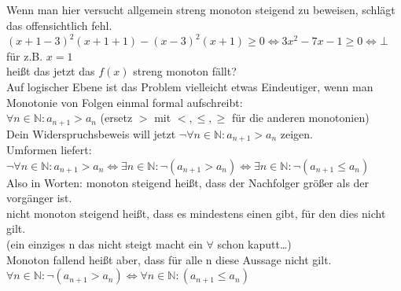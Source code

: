\documentclass{article}
\begin{document}
	Wenn man hier versucht allgemein streng monoton steigend zu beweisen, schlägt das offensichtlich fehl.\\
	$(x+1-3)^2(x+1+1) - (x-3)^2(x+1) \geq 0\iff 3x^2-7x-1\geq 0 \iff \bot$ für z.B. $x=1$\\
	heißt das jetzt das $f(x)$ streng monoton fällt?\\
	Auf logischer Ebene ist das Problem vielleicht etwas Eindeutiger, wenn man Monotonie von Folgen einmal formal aufschreibt:\\
	$\forall n\in \mathbb{N}: a_{n+1}>a_{n}$ (ersetz $>$ mit $<,\leq,\geq$ für die anderen monotonien)\\
	Dein Widerspruchsbeweis will jetzt $\lnot \forall n\in \mathbb{N}: a_{n+1}>a_{n}$ zeigen.\\
	Umformen liefert: $\lnot\forall n\in \mathbb{N}: a_{n+1}>a_{n}\iff\exists n\in \mathbb{N}:\lnot( a_{n+1}>a_{n}) \iff \exists n\in \mathbb{N}:\lnot( a_{n+1}\leq a_{n})$\\
	Also in Worten: monoton steigend heißt, dass der Nachfolger größer als der vorgänger ist.\\
	nicht monoton steigend heißt, dass es mindestens einen gibt, für den dies nicht gilt.\\
	(ein einziges n das nicht steigt macht ein $\forall$ schon kaputt\dots)\\
	Monoton fallend heißt aber, dass für alle n diese Aussage nicht gilt.\\
	$\forall n\in \mathbb{N}: \lnot ( a_{n+1}>a_{n}) \iff \forall n\in \mathbb{N}:( a_{n+1}\leq a_{n})$\\
\end{document}
